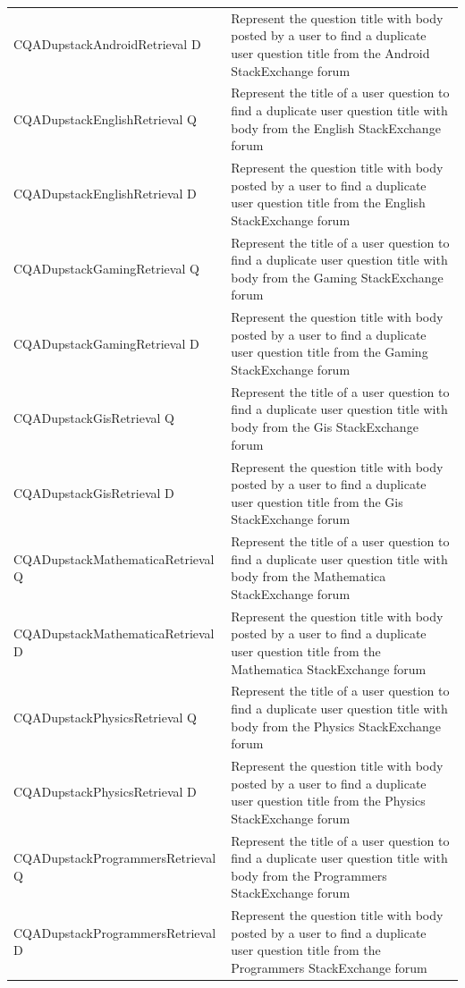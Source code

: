 \documentclass{article}
\begin{document}
\begin{longtable}{lp{9cm}}
CQADupstackAndroidRetrieval D & Represent the question title with body posted by a user to find a duplicate user question title from the Android StackExchange forum \\
CQADupstackEnglishRetrieval Q & Represent the title of a user question to find a duplicate user question title with body from the English StackExchange forum \\
CQADupstackEnglishRetrieval D & Represent the question title with body posted by a user to find a duplicate user question title from the English StackExchange forum \\
CQADupstackGamingRetrieval Q & Represent the title of a user question to find a duplicate user question title with body from the Gaming StackExchange forum \\
CQADupstackGamingRetrieval D & Represent the question title with body posted by a user to find a duplicate user question title from the Gaming StackExchange forum \\
CQADupstackGisRetrieval Q & Represent the title of a user question to find a duplicate user question title with body from the Gis StackExchange forum \\
CQADupstackGisRetrieval D & Represent the question title with body posted by a user to find a duplicate user question title from the Gis StackExchange forum \\
CQADupstackMathematicaRetrieval Q & Represent the title of a user question to find a duplicate user question title with body from the Mathematica StackExchange forum \\
CQADupstackMathematicaRetrieval D & Represent the question title with body posted by a user to find a duplicate user question title from the Mathematica StackExchange forum \\
CQADupstackPhysicsRetrieval Q & Represent the title of a user question to find a duplicate user question title with body from the Physics StackExchange forum \\
CQADupstackPhysicsRetrieval D & Represent the question title with body posted by a user to find a duplicate user question title from the Physics StackExchange forum \\
CQADupstackProgrammersRetrieval Q & Represent the title of a user question to find a duplicate user question title with body from the Programmers StackExchange forum \\
CQADupstackProgrammersRetrieval D & Represent the question title with body posted by a user to find a duplicate user question title from the Programmers StackExchange forum \\

\end{longtable}
\end{document}
